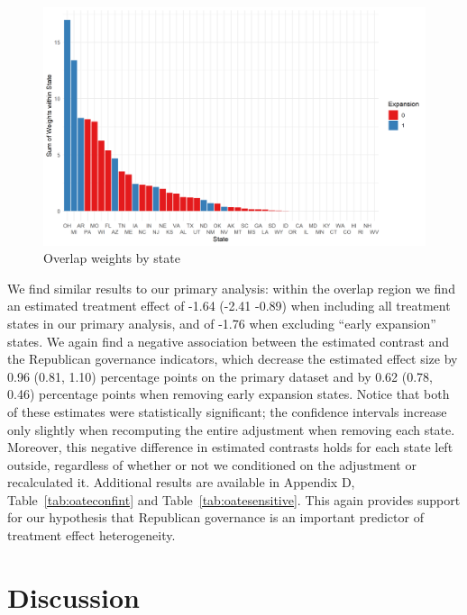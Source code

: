 \documentclass[12pt]{article}
\begin{document}
\begin{figure}[]
\begin{center}
    \includegraphics[scale=0.6]{01_Plots/oate-region-c1-a.png}
    \caption{Overlap weights by state}
    \label{oatearea}
\end{center}
\end{figure}

We find similar results to our primary analysis: within the overlap region we find an estimated treatment effect of -1.64 (-2.41 -0.89) when including all treatment states in our primary analysis, and of -1.76 when excluding ``early expansion'' states. We again find a negative association between the estimated contrast and the Republican governance indicators, which decrease the estimated effect size by 0.96 (0.81, 1.10) percentage points on the primary dataset and by 0.62 (0.78, 0.46) percentage points when removing early expansion states. Notice that both of these estimates were statistically significant; the confidence intervals increase only slightly when recomputing the entire adjustment when removing each state. Moreover, this negative difference in estimated contrasts holds for each state left outside, regardless of whether or not we conditioned on the adjustment or recalculated it. Additional results are available in Appendix D, Table~\ref{tab:oateconfint} and Table~\ref{tab:oatesensitive}. This again provides support for our hypothesis that Republican governance is an important predictor of treatment effect heterogeneity.

\section{Discussion}
\end{document}
